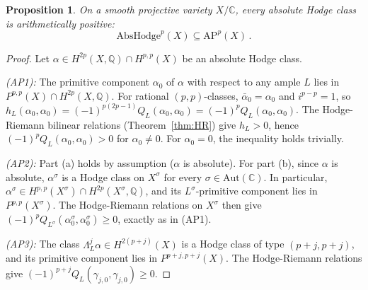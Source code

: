 \documentclass[aps,prd,twocolumn,superscriptaddress,nofootinbib]{revtex4-2}
\newtheorem{proposition}[theorem]{Proposition}
\theoremstyle{definition}
\theoremstyle{remark}
\begin{document}
\begin{proposition}
\label{prop:absolute_implies_ap}
On a smooth projective variety $X/\mathbb{C}$, every absolute Hodge class is arithmetically positive:
\begin{equation}
\mathrm{AbsHodge}^p(X) \subseteq \mathrm{AP}^p(X)\,.
\end{equation}
\end{proposition}

\begin{proof}
Let $\alpha \in H^{2p}(X, \mathbb{Q}) \cap H^{p,p}(X)$ be an absolute Hodge class.

\textit{(AP1):} The primitive component $\alpha_0$ of $\alpha$ with respect to any ample $L$ lies in $P^{p,p}(X) \cap H^{2p}(X, \mathbb{Q})$. For rational $(p,p)$-classes, $\bar{\alpha}_0 = \alpha_0$ and $i^{p-p} = 1$, so $h_L(\alpha_0, \alpha_0) = (-1)^{p(2p-1)} Q_L(\alpha_0, \alpha_0) = (-1)^p Q_L(\alpha_0, \alpha_0)$. The Hodge-Riemann bilinear relations (Theorem~\ref{thm:HR}) give $h_L > 0$, hence $(-1)^p Q_L(\alpha_0, \alpha_0) > 0$ for $\alpha_0 \neq 0$. For $\alpha_0 = 0$, the inequality holds trivially.

\textit{(AP2):} Part (a) holds by assumption ($\alpha$ is absolute). For part (b), since $\alpha$ is absolute, $\alpha^\sigma$ is a Hodge class on $X^\sigma$ for every $\sigma \in \mathrm{Aut}(\mathbb{C})$. In particular, $\alpha^\sigma \in H^{p,p}(X^\sigma) \cap H^{2p}(X^\sigma, \mathbb{Q})$, and its $L^\sigma$-primitive component lies in $P^{p,p}(X^\sigma)$. The Hodge-Riemann relations on $X^\sigma$ then give $(-1)^p Q_{L^\sigma}(\alpha_0^\sigma, \alpha_0^\sigma) \geq 0$, exactly as in (AP1).

\textit{(AP3):} The class $\Lambda_L^j \alpha \in H^{2(p+j)}(X)$ is a Hodge class of type $(p+j, p+j)$, and its primitive component lies in $P^{p+j, p+j}(X)$. The Hodge-Riemann relations give $(-1)^{p+j} Q_L(\gamma_{j,0}, \gamma_{j,0}) \geq 0$.
\end{proof}
\end{document}
